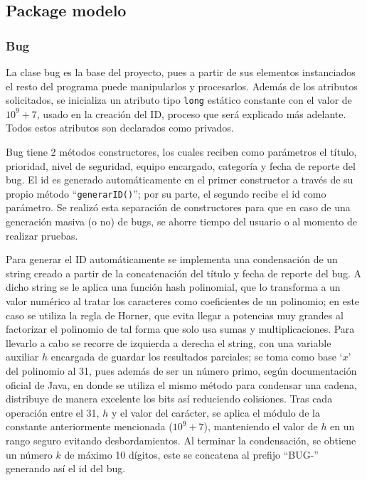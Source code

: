 \documentclass[12pt,letterpaper]{article}
\begin{document}
\subsection{Package modelo}

\subsubsection*{Bug}
La clase bug es la base del proyecto, pues a partir de sus elementos instanciados el resto del programa puede manipularlos y procesarlos. Además de los atributos solicitados, se inicializa un atributo tipo \texttt{long} estático constante con el valor de $10^9+7$, usado en la creación del ID, proceso que será explicado más adelante. Todos estos atributos son declarados como privados.

Bug tiene 2 métodos constructores, los cuales reciben como parámetros el título, prioridad, nivel de seguridad, equipo encargado, categoría y fecha de reporte del bug. El id es generado automáticamente en el primer constructor a través de su propio método ``\texttt{generarID()}''; por su parte, el segundo recibe el id como parámetro. Se realizó esta separación de constructores para que en caso de una generación masiva (o no) de bugs, se ahorre tiempo del usuario o al momento de realizar pruebas.

Para generar el ID automáticamente se implementa una condensación de un string creado a partir de la concatenación del título y fecha de reporte del bug. A dicho string se le aplica una función hash polinomial, que lo transforma a un valor numérico al tratar los caracteres como coeficientes de un polinomio; en este caso se utiliza la regla de Horner, que evita llegar a potencias muy grandes al factorizar el polinomio de tal forma que solo usa sumas y multiplicaciones. Para llevarlo a cabo se recorre de izquierda a derecha el string, con una variable auxiliar $h$ encargada de guardar los resultados parciales; se toma como base `$x$' del polinomio al 31, pues además de ser un número primo, según documentación oficial de Java, en donde se utiliza el mismo método para condensar una cadena, distribuye de manera excelente los bits así reduciendo colisiones. Tras cada operación entre el 31, $h$ y el valor del carácter, se aplica el módulo de la constante anteriormente mencionada ($10^9+7$), manteniendo el valor de $h$ en un rango seguro evitando desbordamientos. Al terminar la condensación, se obtiene un número $k$ de máximo 10 dígitos, este se concatena al prefijo ``BUG-'' generando así el id del bug.
\end{document}
